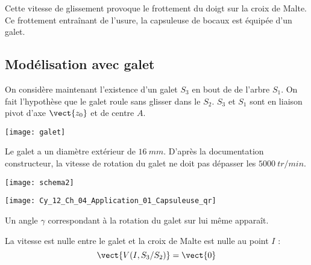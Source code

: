 
\ifprof%
\begin{corrige}

Cette vitesse de glissement provoque le frottement du doigt sur la croix de Malte. Ce frottement entraînant de l'usure, la capsuleuse de bocaux est équipée d'un galet.

\end{corrige}
\else\fi


\subsection*{Modélisation avec galet}
\ifprof
\else
On considère maintenant l'existence d'un galet $S_3$ en bout de de l'arbre $S_1$. On fait l'hypothèse que le galet roule sans glisser dans le $S_2$. $S_3$ et $S_1$ sont en liaison pivot d'axe $\vect{z_0}$ et de centre $A$.


\begin{marginfigure}
 \texttt{[image: galet]}
\end{marginfigure}

Le galet a un diamètre extérieur de $\SI{16}{mm}$. D'après la documentation constructeur, la vitesse de rotation du galet ne doit pas dépasser les $\SI{5000}{tr/min}$.



\begin{center}
 \texttt{[image: schema2]}
\end{center}
\fi

\ifprof
\else
\begin{marginfigure}
\centering
\texttt{[image: Cy\_12\_Ch\_04\_Application\_01\_Capsuleuse\_qr]}
\end{marginfigure}
\fi

\ifprof%
\begin{corrige}

Un angle $\gamma$ correspondant à la rotation du galet sur lui même apparaît.

\end{corrige}
\else \fi

\ifprof%
\begin{corrige}
La vitesse est nulle entre le galet et la croix de Malte est nulle au point $I$ :
$$ 
\vect{V(I,S_3/S_2)} = \vect{0}
$$
\end{corrige}\else\fi

